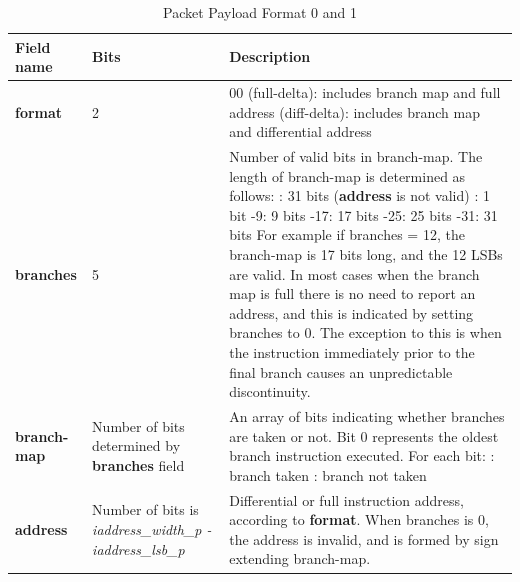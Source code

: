 \begin{table}[htp]
    \centering
    \caption{Packet Payload Format 0 and 1}
    \label{tab:te_inst0-1}
    \begin{tabulary}{\textwidth}{|l|p{35mm}|p{80mm}|}
        \hline
        {\bf Field name} & {\bf Bits} & {\bf Description} \\
        \hline
        \textbf{format}	& 2	& 00 (full-delta): includes branch map and full address  (diff-delta): includes branch map and differential address\\
        \hline
        \textbf{branches} & 5 & Number of valid bits in branch-map. The length of branch-map is determined as follows: :      31 bits (\textbf{address} is not valid) : 	1 bit -9: 	9 bits -17: 	17 bits -25: 	25 bits -31: 	31 bits \newline
        For example if branches = 12, the branch-map is 17 bits long, and the 12 LSBs are valid. \newline
        In most cases when the branch map is full there is no need to report an address,
        and this is indicated by setting branches to 0.  The exception to this is when 
        the instruction immediately prior to the final branch causes an unpredictable discontinuity.\\
        \hline
        \textbf{branch-map} & Number of bits \newline 
                     determined by \newline 
                     \textbf {branches} field & 
                     An array of bits indicating whether branches are taken or not.\newline
        Bit 0 represents the oldest branch instruction executed.   For each bit: : branch taken : branch not taken \\
        \hline
        \textbf{address}	& Number of bits \newline 
                  is \textit {iaddress\_width\_p - iaddress\_lsb\_p} & 
                    Differential or full instruction address, according to \textbf {format}.  \newline
                    When branches is 0, the address is invalid, and is formed by sign extending branch-map.\\
        \hline
    \end{tabulary}
\end{table}


